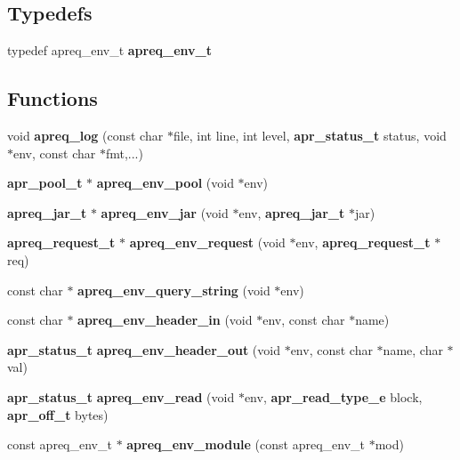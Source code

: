 \subsection*{Typedefs}
\begin{CompactItemize}
\item 
typedef apreq\_\-env\_\-t {\bf apreq\_\-env\_\-t}\label{group__ENV_a0}

\end{CompactItemize}
\subsection*{Functions}
\begin{CompactItemize}
\item 
void {\bf apreq\_\-log} (const char $\ast$file, int line, int level, {\bf apr\_\-status\_\-t} status, void $\ast$env, const char $\ast$fmt,...)\label{group__ENV_a1}

\item 
{\bf apr\_\-pool\_\-t} $\ast$ {\bf apreq\_\-env\_\-pool} (void $\ast$env)\label{group__ENV_a2}

\item 
{\bf apreq\_\-jar\_\-t} $\ast$ {\bf apreq\_\-env\_\-jar} (void $\ast$env, {\bf apreq\_\-jar\_\-t} $\ast$jar)\label{group__ENV_a3}

\item 
{\bf apreq\_\-request\_\-t} $\ast$ {\bf apreq\_\-env\_\-request} (void $\ast$env, {\bf apreq\_\-request\_\-t} $\ast$req)\label{group__ENV_a4}

\item 
const char $\ast$ {\bf apreq\_\-env\_\-query\_\-string} (void $\ast$env)\label{group__ENV_a5}

\item 
const char $\ast$ {\bf apreq\_\-env\_\-header\_\-in} (void $\ast$env, const char $\ast$name)\label{group__ENV_a6}

\item 
{\bf apr\_\-status\_\-t} {\bf apreq\_\-env\_\-header\_\-out} (void $\ast$env, const char $\ast$name, char $\ast$val)\label{group__ENV_a7}

\item 
{\bf apr\_\-status\_\-t} {\bf apreq\_\-env\_\-read} (void $\ast$env, {\bf apr\_\-read\_\-type\_\-e} block, {\bf apr\_\-off\_\-t} bytes)\label{group__ENV_a8}

\item 
const apreq\_\-env\_\-t $\ast$ {\bf apreq\_\-env\_\-module} (const apreq\_\-env\_\-t $\ast$mod)\label{group__ENV_a9}

\end{CompactItemize}


